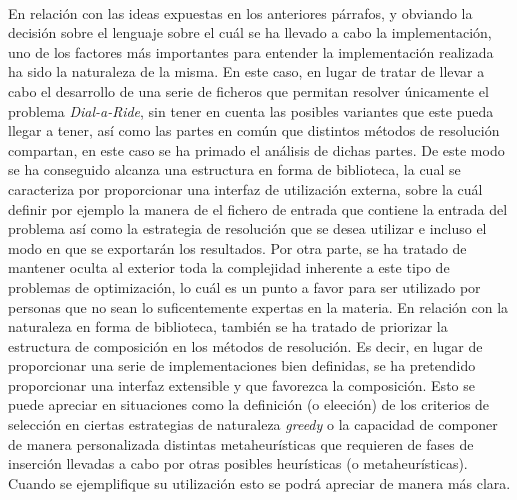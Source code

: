 \documentclass{subfiles}
\begin{document}
        \paragraph{}
        En relación con las ideas expuestas en los anteriores párrafos, y obviando la decisión sobre el lenguaje sobre el cuál se ha llevado a cabo la implementación, uno de los factores más importantes para entender la implementación realizada ha sido la naturaleza de la misma. En este caso, en lugar de tratar de llevar a cabo el desarrollo de una serie de ficheros que permitan resolver únicamente el problema \emph{Dial-a-Ride}, sin tener en cuenta las posibles variantes que este pueda llegar a tener, así como las partes en común que distintos métodos de resolución compartan, en este caso se ha primado el análisis de dichas partes. De este modo se ha conseguido alcanza una estructura en forma de biblioteca, la cual se caracteriza por proporcionar una interfaz de utilización externa, sobre la cuál definir por ejemplo la manera de  el fichero de entrada que contiene la entrada del problema así como la estrategia de resolución que se desea utilizar e incluso el modo en que se exportarán los resultados. Por otra parte, se ha tratado de mantener oculta al exterior toda la complejidad inherente a este tipo de problemas de optimización, lo cuál es un punto a favor para ser utilizado por personas que no sean lo suficentemente expertas en la materia. En relación con la naturaleza en forma de biblioteca, también se ha tratado de priorizar la estructura de composición en los métodos de resolución. Es decir, en lugar de proporcionar una serie de implementaciones bien definidas, se ha pretendido proporcionar una interfaz extensible y que favorezca la composición. Esto se puede apreciar en situaciones como la definición (o eleeción) de los criterios de selección en ciertas estrategias de naturaleza \emph{greedy} o la capacidad de componer de manera personalizada distintas metaheurísticas que requieren de fases de inserción llevadas a cabo por otras posibles heurísticas (o metaheurísticas). Cuando se ejemplifique su utilización esto se podrá apreciar de manera más clara. 
\end{document}
